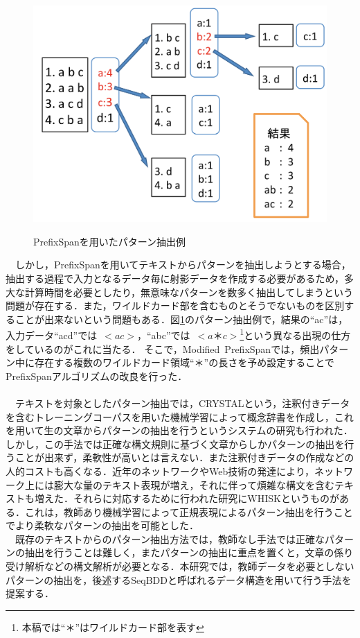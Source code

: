 \documentclass[12pt,twoside, fleqn]{ujbook}
\begin{document}
	
	\begin{figure}[htbp]
	\begin{center}
		\includegraphics [clip, height=9cm]{./img/prefixspan.png}
		\caption{PrefixSpanを用いたパターン抽出例}
		\label{fig:prefixspan}
	\end{center}
	\end{figure}

　しかし，PrefixSpanを用いてテキストからパターンを抽出しようとする場合，抽出する過程で入力となるデータ毎に射影データを作成する必要があるため，多大な計算時間を必要としたり，無意味なパターンを数多く抽出してしまうという問題が存在する．また，ワイルドカード部を含むものとそうでないものを区別することが出来ないという問題もある．図\ref{fig:prefixspan}のパターン抽出例で，結果の``ac''は，入力データ``acd''では\ $<ac>$，``abc''では\ $<a＊c>$\footnote{本稿では``＊''はワイルドカード部を表す}という異なる出現の仕方をしているのがこれに当たる．
そこで，Modified\ PrefixSpan\cite{Kitakami:2002:MPM:646966.759862}では，頻出パターン中に存在する複数のワイルドカード領域``＊''の長さを予め設定することでPrefixSpanアルゴリズムの改良を行った．\\　\\

　テキストを対象としたパターン抽出では，CRYSTAL\cite{Soderland:1995:CIC:1643031.1643069}という，注釈付きデータを含むトレーニングコーパスを用いた機械学習によって概念辞書を作成し，これを用いて生の文章からパターンの抽出を行うというシステムの研究も行われた．しかし，この手法では正確な構文規則に基づく文章からしかパターンの抽出を行うことが出来ず，柔軟性が高いとは言えない．また注釈付きデータの作成などの人的コストも高くなる．近年のネットワークやWeb技術の発達により，ネットワーク上には膨大な量のテキスト表現が増え，それに伴って煩雑な構文を含むテキストも増えた．それらに対応するために行われた研究にWHISK\cite{Soderland:1999:LIE:309497.309510}というものがある．これは，教師あり機械学習によって正規表現によるパターン抽出を行うことでより柔軟なパターンの抽出を可能とした．\\
　既存のテキストからのパターン抽出方法では，教師なし手法では正確なパターンの抽出を行うことは難しく，またパターンの抽出に重点を置くと，文章の係り受け解析などの構文解析が必要となる．本研究では，教師データを必要としないパターンの抽出を，後述するSeqBDD\cite{Loekito:2010:BDD:1851388.1851396}と呼ばれるデータ構造を用いて行う手法を提案する．
\end{document}
